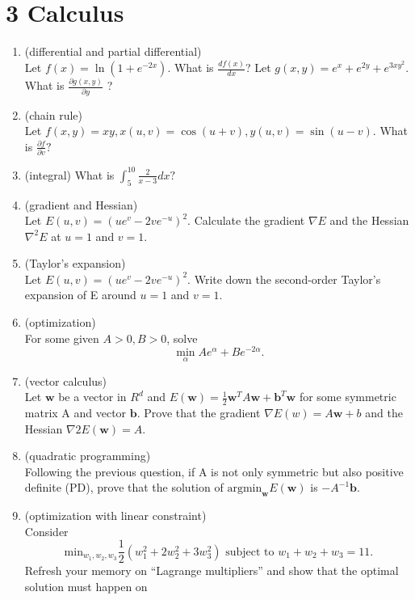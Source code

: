 \documentclass[12pt]{article}
\theoremstyle{definition}
\begin{document}
\section*{3 Calculus}
\begin{enumerate}
  \item (differential and partial differential)\\
    Let  $f(x)=\ln \left(1+e^{-2 x}\right)$. What is  $\frac{d f(x)}{d x}$? 
    Let  $g(x, y)=e^{x}+e^{2 y}+e^{3 x y^{2}}$. What is  $\frac{\partial g(x, y)}{\partial y}$  ?
  \item (chain rule)\\
    Let  $f(x, y)=x y, x(u, v)=\cos (u+v), y(u, v)=\sin (u-v).$ 
    What is  $\frac{\partial f}{\partial v}?$
  \item (integral)
    What is  $\int_{5}^{10} \frac{2}{x-3} dx?$
  \item (gradient and Hessian)\\
    Let  $E(u, v)=\left(u e^{v}-2 v e^{-u}\right)^{2}.$
    Calculate the gradient  $\nabla E$  and the Hessian  $\nabla^{2} E$  at  $u=1$  and  $v=1.$
  \item (Taylor’s expansion)\\
    Let  $E(u, v)=\left(u e^{v}-2 v e^{-u}\right)^{2}.$
    Write down the second-order Taylor's expansion of  E  around $u=1$  and  $v=1 .$
  \item (optimization)\\
    For some given  $A>0, B>0$, solve
    \[
      \min _{\alpha} A e^{\alpha}+B e^{-2 \alpha}
    .\] 
  \item (vector calculus)\\
    Let $\mathbf{w}$ be a vector in $R^d$ and
     $E(\mathbf{w}) = \frac{1}{2}\mathbf{w}^T A\mathbf{w} + \mathbf{b}^T\mathbf{w}$
     for some symmetric matrix A and vector $\mathbf{b}.$
    Prove that the gradient $\nabla  E(w) = A\mathbf{w} + b$ and the Hessian $\nabla 2E(\mathbf{w}) = A.$
  \item (quadratic programming)\\
    Following the previous question, if A is not only symmetric but also positive definite (PD),
    prove that
    the solution of $\text{argmin}_{\mathbf{w}}E(\mathbf{w})$ is $-A^{-1}\mathbf{b}.$
  \item (optimization with linear constraint)\\
    Consider
    \[
      \text{min}_{w_1,w_2,w_3}\frac{1}{2}(w^2_1+2w^2_2+3w^2_3)\text{  subject to  }
      w_1 + w_2 + w_3 = 11
    .\] 
    Refresh your memory on “Lagrange multipliers” and show that the optimal solution must happen on

\end{enumerate}
\end{document}
